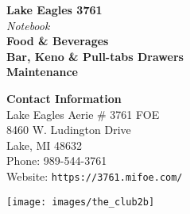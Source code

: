 \documentclass[a0,landscape]{a0poster}
\begin{document}


\begin{minipage}[b]{0.55\linewidth}
\veryHuge \color{NavyBlue} \textbf{Lake Eagles 3761} \color{Black}\\ %
\Huge\textit{  Notebook  }\\[1cm] %
\huge \textbf{
Food \& Beverages \\ 
Bar, Keno \& Pull-tabs Drawers\\
Maintenance }\\ %
\end{minipage}
%
\begin{minipage}[b]{0.25\linewidth}
\color{DarkSlateGray}\Large \textbf{Contact Information}\\
Lake Eagles Aerie \# 3761 FOE\\ %
8460 W. Ludington Drive \\
Lake, MI 48632 \\
Phone: 989-544-3761 \\ %
Website: \texttt{https://3761.mifoe.com/}\\ %
\end{minipage}
%
\begin{minipage}[b]{0.19\linewidth}
\texttt{[image: images/the\_club2b]} %
\end{minipage}

\vspace{1cm} %

\end{document}
